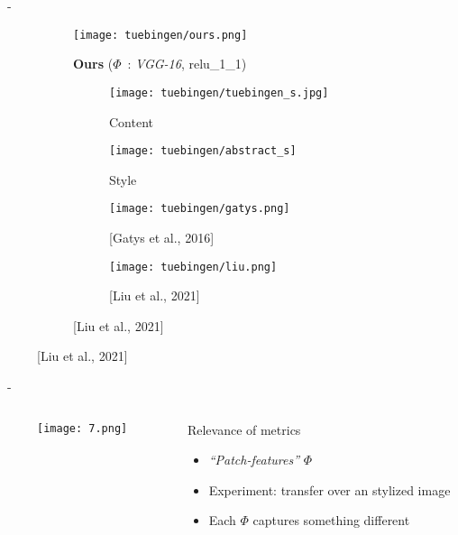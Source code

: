 \documentclass[aspectratio=169, 22pt]{beamer}
\begin{document}
\begin{frame}{\secname~- \subsecname}
  \begin{figure}
    \begin{subfigure}{0.47\linewidth}
      \texttt{[image: tuebingen/ours.png]}
      \caption{\textbf{Ours} ($\Phi$ : \emph{VGG-16}, relu\_1\_1)}
    \end{subfigure}
    \begin{subfigure}{0.45\linewidth}
      \begin{subfigure}{0.45\linewidth}
        \texttt{[image: tuebingen/tuebingen\_s.jpg]}
        \caption{Content}
      \end{subfigure}
      \begin{subfigure}{0.45\linewidth}
        \texttt{[image: tuebingen/abstract\_s]}
        \caption{Style}
      \end{subfigure}

      \begin{subfigure}{0.45\linewidth}
        \texttt{[image: tuebingen/gatys.png]}
        \caption{\scriptsize[Gatys et al., 2016]}
      \end{subfigure}
      \begin{subfigure}{0.45\linewidth}
        \texttt{[image: tuebingen/liu.png]}
        \caption{[Liu et al., 2021]}
      \end{subfigure}
    \end{subfigure}
  \end{figure}
\end{frame}


\begin{frame}{\secname~- \subsecname}
  \begin{columns}
    \begin{column}{0.52\linewidth}
      \begin{figure}
        \centering
        \texttt{[image: 7.png]}
      \end{figure}
    \end{column}
    \begin{column}{0.48\linewidth}
      \begin{block}{Relevance of metrics}
        \begin{itemize}
        \item \emph{``Patch-features''} $\Phi$
        \item Experiment: transfer over an stylized image
        \item Each $\Phi$ captures something different
        \end{itemize}
      \end{block}
    \end{column}
  \end{columns}
\end{frame}
\end{document}

